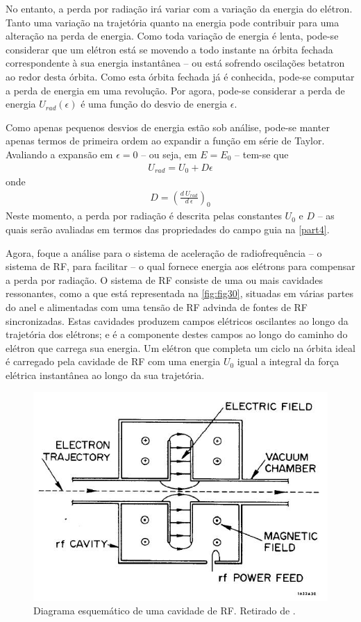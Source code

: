 No entanto, a perda por radiação irá variar com a variação da energia do elétron. Tanto uma variação na trajetória quanto na energia pode contribuir para uma alteração na perda de energia. Como toda variação de energia é lenta, pode-se considerar que um elétron está se movendo a todo instante na órbita fechada correspondente à sua energia instantânea -- ou está sofrendo oscilações betatron ao redor desta órbita. Como esta órbita fechada já é conhecida, pode-se computar a perda de energia em uma revolução. Por agora, pode-se considerar a perda de energia $U_{rad}(\epsilon)$ é uma função do desvio de energia $\epsilon$.

Como apenas pequenos desvios de energia estão sob análise, pode-se manter apenas termos de primeira ordem ao expandir a função em série de Taylor. Avaliando a expansão em $\epsilon=0$ -- ou seja, em $E=E_0$ -- tem-se que
\begin{align}
	U_{rad} = U_0 + D\epsilon\label{eq:3.23}
\end{align}
onde
\begin{align}
	D = \left(\frac{d\ U_{rad}}{d\ \epsilon}\right)_0\label{eq:3.24}
\end{align}
Neste momento, a perda por radiação é descrita pelas constantes $U_0$ e $D$ -- as quais serão avaliadas em termos das propriedades do campo guia na \autoref{part4}.

Agora, foque a análise para o sistema de aceleração de radiofrequência -- o sistema de RF, para facilitar -- o qual fornece energia aos elétrons para compensar a perda por radiação. O sistema de RF consiste de uma ou mais cavidades ressonantes, como a que está representada na \autoref{fig:fig30}, situadas em várias partes do anel e alimentadas com uma tensão de RF advinda de fontes de RF sincronizadas. Estas cavidades produzem campos elétricos oscilantes ao longo da trajetória dos elétrons; e é a componente destes campos ao longo do caminho do elétron que carrega sua energia. Um elétron que completa um ciclo na órbita ideal é carregado pela cavidade de RF com uma energia $U_0$ igual a integral da força elétrica instantânea ao longo da sua trajetória.

\begin{figure}[!htb]
	\centering
	\includegraphics[width=0.7\linewidth]{./Figuras/fig30.jpeg}
	\caption{Diagrama esquemático de uma cavidade de RF. Retirado de \cite{sands1970physics}.}
	\label{fig:fig30}
\end{figure}

